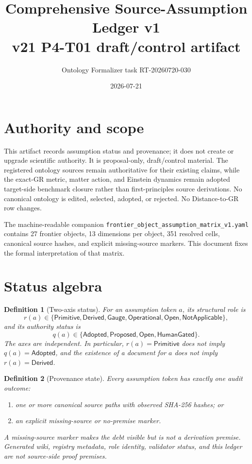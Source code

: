 \documentclass[11pt]{article}
\title{Comprehensive Source-Assumption Ledger v1\\
\large v21 P4-T01 draft/control artifact}
\author{Ontology Formalizer task RT-20260720-030}
\date{2026-07-21}
\newtheorem{definition}{Definition}
\newcommand{\Open}{\mathsf{Open}}
\newcommand{\Proposed}{\mathsf{Proposed}}
\newcommand{\Adopted}{\mathsf{Adopted}}
\newcommand{\HumanGated}{\mathsf{HumanGated}}
\begin{document}
\maketitle

\section*{Authority and scope}

This artifact records assumption status and provenance; it does not create or
upgrade scientific authority.  It is proposal-only, draft/control material.
The registered ontology sources remain authoritative for their existing
claims, while the exact-GR metric, matter action, and Einstein dynamics remain
adopted target-side benchmark closure rather than first-principles source
derivations.  No canonical ontology is edited, selected, adopted, or rejected.
No Distance-to-GR row changes.

The machine-readable companion
\texttt{frontier\_object\_assumption\_matrix\_v1.yaml} contains 27 frontier
objects, 13 dimensions per object, 351 resolved cells, canonical source
hashes, and explicit missing-source markers.  This document fixes the formal
interpretation of that matrix.

\section{Status algebra}

\begin{definition}[Two-axis status]
For an assumption token $a$, its structural role is
\[
 r(a)\in\{\mathsf{Primitive},\mathsf{Derived},\mathsf{Gauge},
 \mathsf{Operational},\mathsf{Open},\mathsf{NotApplicable}\},
\]
and its authority status is
\[
 q(a)\in\{\Adopted,\Proposed,\Open,\HumanGated\}.
\]
The axes are independent.  In particular,
\(r(a)=\mathsf{Primitive}\) does not imply \(q(a)=\Adopted\), and the
existence of a document for $a$ does not imply
\(r(a)=\mathsf{Derived}\).
\end{definition}

\begin{definition}[Provenance state]
Every assumption token has exactly one audit outcome:
\begin{enumerate}
  \item one or more canonical source paths with observed SHA-256 hashes; or
  \item an explicit missing-source or no-premise marker.
\end{enumerate}
A missing-source marker makes the debt visible but is not a derivation premise.
Generated wiki, registry metadata, role identity, validator status, and this
ledger are not source-side proof premises.
\end{definition}
\end{document}
